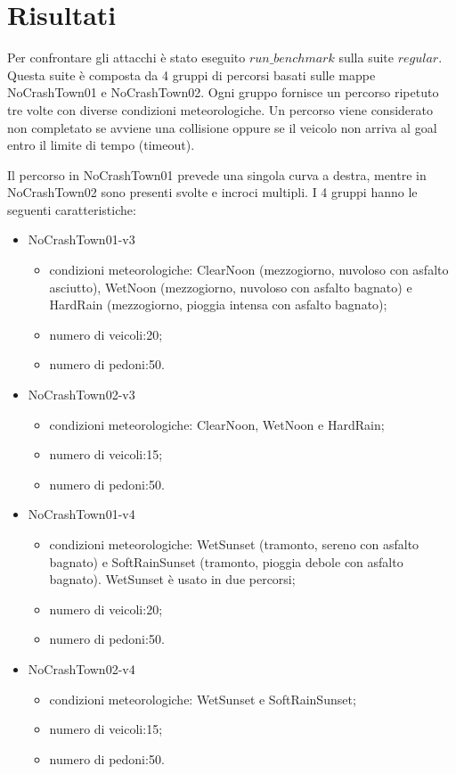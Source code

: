 \section{Risultati}
Per confrontare gli attacchi è stato eseguito $run\_benchmark$ sulla suite $regular$.
Questa suite è composta da 4 gruppi di percorsi basati sulle mappe NoCrashTown01 e NoCrashTown02. Ogni gruppo fornisce un percorso ripetuto tre volte con diverse condizioni meteorologiche.
Un percorso viene considerato non completato se avviene una collisione oppure se il veicolo non arriva al goal entro il limite di tempo (timeout).

Il percorso in NoCrashTown01 prevede una singola curva a destra, mentre in NoCrashTown02 sono presenti svolte e incroci multipli.
I 4 gruppi hanno le seguenti caratteristiche:\begin{itemize}
    \item NoCrashTown01-v3\begin{itemize}
        \item condizioni meteorologiche: ClearNoon (mezzogiorno, nuvoloso con asfalto asciutto), WetNoon (mezzogiorno, nuvoloso con asfalto bagnato) e HardRain (mezzogiorno, pioggia intensa con asfalto bagnato);
        \item numero di veicoli:20;
        \item numero di pedoni:50.
    \end{itemize}
    \item NoCrashTown02-v3 \begin{itemize}
        \item condizioni meteorologiche: ClearNoon, WetNoon e HardRain;
        \item numero di veicoli:15;
        \item numero di pedoni:50.
    \end{itemize}
    \item NoCrashTown01-v4 \begin{itemize}
        \item condizioni meteorologiche: WetSunset (tramonto, sereno con asfalto bagnato) e SoftRainSunset (tramonto, pioggia debole  con asfalto bagnato). WetSunset è usato in due percorsi;
        \item numero di veicoli:20;
        \item numero di pedoni:50.
    \end{itemize}
    \item NoCrashTown02-v4 \begin{itemize}
        \item condizioni meteorologiche: WetSunset  e SoftRainSunset;
        \item numero di veicoli:15;
        \item numero di pedoni:50.
    \end{itemize}
\end{itemize}

